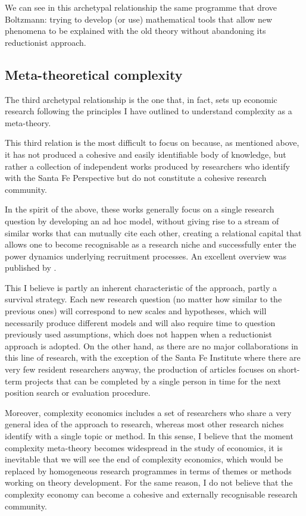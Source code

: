 \documentclass[a4paper, headings=standardclasses]{scrartcl}
\begin{document}
We can see in this archetypal relationship the same programme that drove Boltzmann: trying to develop (or use) mathematical tools that allow new phenomena to be explained with the old theory without abandoning its reductionist approach.

\subsection{Meta-theoretical complexity}
The third archetypal relationship is the one that, in fact, sets up economic research following the principles I have outlined to understand complexity as a meta-theory.

This third relation is the most difficult to focus on because, as mentioned above, it has not produced a cohesive and easily identifiable body of knowledge, but rather a collection of independent works produced by researchers who identify with the Santa Fe Perspective but do not constitute a cohesive research community.

In the spirit of the above, these works generally focus on a single research question by developing an ad hoc model, without giving rise to a stream of similar works that can mutually cite each other, creating a relational capital that allows one to become recognisable as a research niche and successfully enter the power dynamics underlying recruitment processes. An excellent overview was published by \textcite{arthur2021}.

This I believe is partly an inherent characteristic of the approach, partly a survival strategy.
Each new research question (no matter how similar to the previous ones) will correspond to new scales and hypotheses, which will necessarily produce different models and will also require time to question previously used assumptions, which does not happen when a reductionist approach is adopted.
On the other hand, as there are no major collaborations in this line of research, with the exception of the Santa Fe Institute where there are very few resident researchers anyway, the production of articles focuses on short-term projects that can be completed by a single person in time for the next position search or evaluation procedure.

Moreover, complexity economics includes a set of researchers who share a very general idea of the approach to research, whereas most other research niches identify with a single topic or method.
In this sense, I believe that the moment complexity meta-theory becomes widespread in the study of economics, it is inevitable that we will see the end of complexity economics, which would be replaced by homogeneous research programmes in terms of themes or methods working on theory development.
For the same reason, I do not believe that the complexity economy can become a cohesive and externally recognisable research community.
\end{document}
